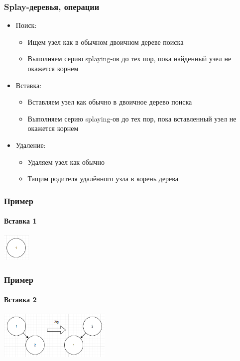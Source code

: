 \documentclass[xetex,mathserif,serif]{beamer}
\begin{document}
    \begin{frame}
        \frametitle{Splay-деревья, операции}
        \begin{itemize}
            \item Поиск:
            \begin{itemize}
                \item Ищем узел как в обычном двоичном дереве поиска
                \item Выполняем серию splaying-ов до тех пор, пока найденный узел не окажется корнем
            \end{itemize}
            \item Вставка:
            \begin{itemize}
                \item Вставляем узел как обычно в двоичное дерево поиска
                \item Выполняем серию splaying-ов до тех пор, пока вставленный узел не окажется корнем
            \end{itemize}
            \item Удаление:
            \begin{itemize}
                \item Удаляем узел как обычно
                \item Тащим родителя удалённого узла в корень дерева
            \end{itemize}
        \end{itemize}
    \end{frame}

    \begin{frame}
        \frametitle{Пример}
        \framesubtitle{Вставка 1}
        \begin{center}
            \includegraphics[width=0.1\textwidth]{splay1.png}
        \end{center}
    \end{frame}

    \begin{frame}
        \frametitle{Пример}
        \framesubtitle{Вставка 2}
        \begin{center}
            \includegraphics[width=0.4\textwidth]{splay2.png}
        \end{center}
    \end{frame}
\end{document}
